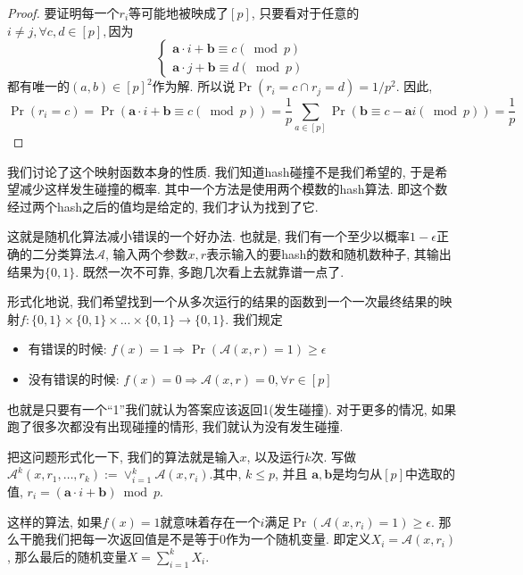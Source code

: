 \documentclass{ctexart}
\begin{document}
\begin{proof}
    要证明每一个$r_i$等可能地被映成了$[p]$, 只要看对于任意的$i\neq j, \forall c, d \in [p], $因为
    $$
\left\{\begin{array}{l}
\boldsymbol{a} \cdot i+\boldsymbol{b} \equiv c(\bmod p) \\
\boldsymbol{a} \cdot j+\boldsymbol{b} \equiv d(\bmod p)
\end{array}\right.
$$
都有唯一的$(a, b) \in [p]^2$作为解. 所以说$\operatorname{Pr}\left(r_i=c \cap r_j=d\right)=1 / p^2$.  
因此, 
$$
\operatorname{Pr}\left(r_i=c\right)=\operatorname{Pr}(\boldsymbol{a} \cdot i+\boldsymbol{b} \equiv c(\bmod p))=\frac{1}{p} \sum_{a \in[p]} \operatorname{Pr}(\boldsymbol{b} \equiv c-\boldsymbol a i(\bmod p))=\frac{1}{p}
$$
\end{proof}

我们讨论了这个映射函数本身的性质. 我们知道hash碰撞不是我们希望的, 于是希望减少这样发生碰撞的概率. 其中一个方法是使用两个模数的hash算法. 即这个数经过两个hash之后的值均是给定的, 我们才认为找到了它. 

这就是随机化算法减小错误的一个好办法. 也就是, 我们有一个至少以概率$1-\epsilon$正确的二分类算法$\mathcal A$, 输入两个参数$x, r$表示输入的要hash的数和随机数种子, 其输出结果为$\{ 0, 1 \}$. 既然一次不可靠, 多跑几次看上去就靠谱一点了. 

形式化地说, 我们希望找到一个从多次运行的结果的函数到一个一次最终结果的映射$f:\{ 0, 1 \}\times \{ 0, 1 \}\times ... \times \{ 0, 1 \} \to \{ 0, 1 \}$. 我们规定
\begin{itemize}
    \item 有错误的时候: $f(x)=1 \Longrightarrow \operatorname{Pr}(\mathscr{A}(x, r)=1) \geq \epsilon$
    \item 没有错误的时候:  $f(x)=0 \Longrightarrow \mathscr{A}(x, r)=0, \forall r \in[p]$
\end{itemize}
也就是只要有一个``1''我们就认为答案应该返回1(发生碰撞). 对于更多的情况, 如果跑了很多次都没有出现碰撞的情形, 我们就认为没有发生碰撞. 

把这问题形式化一下, 我们的算法就是输入$x$, 以及运行$k$次. 写做$\mathscr{A}^k\left(x, r_1, \ldots, r_k\right):=\lor_{i=1}^k \mathscr{A}\left(x, r_i\right)$.其中, $k \leq p$, 并且
$\boldsymbol a,\boldsymbol b$是均匀从$[p]$中选取的值, $r_i=(\boldsymbol{a} \cdot i+\boldsymbol{b}) \bmod p$. 

这样的算法, 如果$f(x)=1$就意味着存在一个$i$满足$\operatorname{Pr}\left(\mathscr{A}\left(x, r_i\right)=1\right) \geq \epsilon$. 那么干脆我们把每一次返回值是不是等于0作为一个随机变量. 即定义$X_i=\mathscr{A}\left(x, r_i\right)$, 那么最后的随机变量$X=\sum_{i=1}^k X_i$. 
\end{document}
